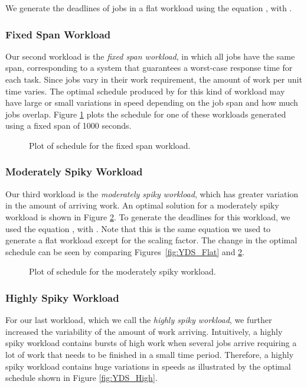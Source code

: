 \documentclass[11pt]{article}
\begin{document}
We generate the deadlines of jobs in a flat workload using the equation
, with .

\subsubsection{Fixed Span Workload}
Our second workload is the {\em fixed span workload}, in which all jobs
have the same span, corresponding to a system that guarantees a
worst-case response time for each task.
Since jobs vary in their work requirement, the amount of work per unit
time varies.
The optimal schedule produced by  for this kind of workload may
have large or small variations in speed depending on the job span
and how much jobs overlap.
Figure \ref{fig:YDS_Fixed} plots the  schedule for
one of these workloads generated using a fixed span of 1000 seconds.

\begin{figure}
\centering
{}
\caption{Plot of  schedule for the fixed span workload.}
\label{fig:YDS_Fixed}
\end{figure}

\subsubsection{Moderately Spiky Workload}

Our third workload is the {\em moderately spiky workload}, which has
greater variation in the amount of arriving work.
An optimal solution for a moderately spiky workload is shown in 
Figure \ref{fig:YDS_Moderate}.
To generate the deadlines for this workload, we used the equation
, with .
Note that this is the same equation we used to generate a flat
workload except for the scaling factor.
The change in the optimal schedule can be seen by comparing
Figures~\ref{fig:YDS_Flat} and \ref{fig:YDS_Moderate}.

\begin{figure}
\centering
{}
\caption{Plot of  schedule for the moderately spiky workload.}
\label{fig:YDS_Moderate}
\end{figure} 

\subsubsection{Highly Spiky Workload}

For our last workload, which we call the {\em highly spiky workload}, 
we further increased the variability of the amount of work arriving.
Intuitively, a highly spiky workload contains bursts of high work
when several jobs arrive requiring a lot of work that needs to be
finished in a small time period.
Therefore, a highly spiky workload
contains huge variations in speeds as illustrated by the optimal
 schedule shown in Figure \ref{fig:YDS_High}.
\end{document}
